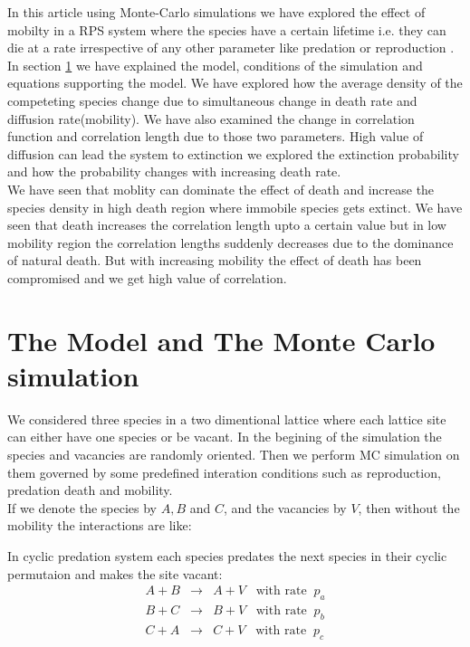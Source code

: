\documentclass[aps, prl, twocolumn, amsmath, superscriptaddress,showkeys,showpacs]{revtex4-2}
\def\bea{\begin{eqnarray}}
\def\eea{\end{eqnarray}}
\begin{document}
	\par In this article using Monte-Carlo simulations \citep{mooney1997monte, zio2013monte} we have explored the effect of mobilty in a RPS system where the species have a certain lifetime i.e. they can die at a rate irrespective of any other parameter like predation or reproduction . In section \ref{simulation} we have explained the model, conditions of the simulation and equations supporting the model. We have explored how the average density of the competeting species change due to simultaneous change in death rate and diffusion rate(mobility). We have also examined the change in correlation function and correlation length due to those two parameters. High value of diffusion can lead the system to extinction \citep{reichenbach2007mobility} we explored the extinction probability and how the probability changes with increasing death rate.\\
	We have seen that moblity can dominate the effect of death and increase the species density in high death region where immobile species gets extinct. We have seen that death increases the correlation length upto a certain value but in low mobility region the correlation lengths suddenly decreases due to the dominance of natural death. But with increasing mobility the effect of death has been compromised and we get high value of correlation.\\


\section{The Model and The Monte Carlo simulation}
\label{simulation}

\noindent
We considered three species in a two dimentional lattice where each lattice site can either have one species or be vacant. In the begining of the simulation the species and vacancies are randomly oriented. Then we perform MC simulation on them  governed by some predefined interation conditions such as reproduction, predation death and mobility.\\
If we denote the species by $A,B$ and $C$, and the vacancies by $V$, then without the mobility the interactions are like: 

In cyclic predation system each species predates the next species in their cyclic permutaion and makes the site vacant:
\bea
A + B & \longrightarrow & A + V \;\;\; \mbox{with rate}\;\; p_a\nonumber \\
B + C & \longrightarrow & B + V \;\;\; \mbox{with rate}\;\; p_b\nonumber \\
C + A & \longrightarrow & C + V \;\;\; \mbox{with rate}\;\; p_c
\label{predation}
\eea 
\end{document}
